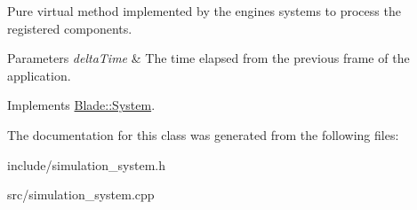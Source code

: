 Pure virtual method implemented by the engine\textquotesingle{}s systems to process the registered components. 


\begin{DoxyParams}{Parameters}
{\em delta\+Time} & The time elapsed from the previous frame of the application. \\
\hline
\end{DoxyParams}


Implements \hyperlink{class_blade_1_1_system_a80c186f5f9f8fa4fd317b861853fe6a8}{Blade\+::\+System}.



The documentation for this class was generated from the following files\+:\begin{DoxyCompactItemize}
\item 
include/simulation\+\_\+system.\+h\item 
src/simulation\+\_\+system.\+cpp\end{DoxyCompactItemize}
